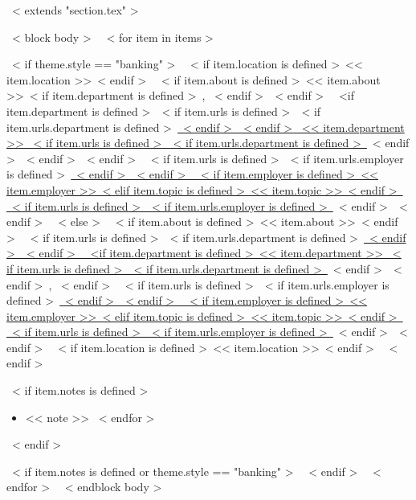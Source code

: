 ~< extends "section.tex" >~

~< block body >~
  ~< for item in items >~
    \begin{samepage}
      \cventry
        ~< if theme.style == "banking" >~
          {~< if item.location is defined >~<< item.location >>~< endif >~}
          {~< if item.about is defined >~<< item.about >>~< if item.department is defined >~, ~< endif >~~< endif >~%
	    ~<if item.department is defined >~~< if item.urls is defined >~~< if item.urls.department is defined >~\href{<< item.urls.department >>}{~< endif >~~< endif >~
	      << item.department >>
	    ~< if item.urls is defined >~~< if item.urls.department is defined >~}~< endif >~~< endif >~~< endif >~}
          {~< if item.urls is defined >~~< if item.urls.employer is defined >~\href{<< item.urls.employer >>}{~< endif >~~< endif >~%
             ~< if item.employer is defined >~<< item.employer >>~< elif item.topic is defined >~<< item.topic >>~< endif >~%
           ~< if item.urls is defined >~~< if item.urls.employer is defined >~}~< endif >~~< endif >~}
        ~< else >~
          {~< if item.about is defined >~<< item.about >>~< endif >~}
          {~< if item.urls is defined >~~< if item.urls.department is defined >~\href{<< item.urls.department >>}{~< endif >~~< endif >~%
             ~<if item.department is defined >~<< item.department >>
           ~< if item.urls is defined >~~< if item.urls.department is defined >~}~< endif >~~< endif >~, ~< endif >~
           ~< if item.urls is defined >~~< if item.urls.employer is defined >~\href{<< item.urls.employer >>}{~< endif >~~< endif >~%
             ~< if item.employer is defined >~<< item.employer >>~< elif item.topic is defined >~<< item.topic >>~< endif >~%
           ~< if item.urls is defined >~~< if item.urls.employer is defined >~}~< endif >~~< endif >~}
          {~< if item.location is defined >~<< item.location >>~< endif >~}
        ~< endif >~
        {}
        {
          ~< if item.notes is defined >~
            \begin{itemize}
              ~< for note in item.notes >~
                \item{<< note >>}
              ~< endfor >~
            \end{itemize}
          ~< endif >~
        }
    \end{samepage}
    ~< if item.notes is defined or theme.style == "banking" >~
    ~< endif >~
  ~< endfor >~
~< endblock body >~
